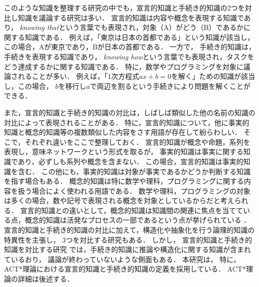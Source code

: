 このような知識を整理する研究の中でも，宣言的知識と手続き的知識の2つを対比し知識を議論する研究は多い\cite{anderson1982acquisition, mccormick1997conceptual, ten1999procedural}．
宣言的知識は内容や概念を表現する知識であり，
{\it knowing that}\cite{ryle1945knowing}という言葉でも表現され，対象（A）がどう（B）であるかに関する知識である．
例えば，「東京は日本の首都である」という知識が該当し，この場合，Aが東京であり，Bが日本の首都である．
一方で，
手続き的知識は，手続きを表現する知識であり，
{\it knowing how}\cite{ryle1945knowing}という言葉でも表現され，タスクをどう達成するかに関する知識である．
特に，数学やプログラミングを対象に議論されることが多い．
例えば，「1次方程式$ax + b = 0$を解く」ための知識が該当し，この場合，
$b$を移行し$a$で両辺を割るという手続きにより問題を解くことができる．

また，宣言的知識と手続き的知識の対比は，しばしば類似した他の名前の知識の対比によって表現されることがある．
特に，宣言的知識について，他に事実的知識と概念的知識等の複数類似した内容をさす用語が存在して紛らわしい．
そこで，それぞれ違いをここで整理しておく．
宣言的知識が概念や命題，系列を表現し，意味ネットワークという形式を取る\cite{anderson1990adaptive}が，
事実的知識は事実に関する知識であり，必ずしも系列や概念を含まない．
この場合，宣言的知識は事実的知識を含む．
この他にも，事実的知識は対象が事実であるかどうか判断する知識を指す場合もある\cite{unger1968analysis}．
概念的知識は特に数学や理科，プログラミングに関する内容を扱う場合によく使われる用語である\cite{mccormick1997conceptual, rittle1999conceptual, hiebert2013conceptual}．
数学や理科，プログラミングの対象は多くの場合，数や記号で表現される概念を対象としているからだと考えられる．
宣言的知識との違いとして，概念的知識は知識間の関連に焦点を当てている点，概念的知識は活発なプロセスの一部であるという点が挙げられている
\cite{mccormick1997conceptual}．
宣言的知識と手続き的知識の対比に加えて，構造化や抽象化を行う論理的知識の特異性を主張し，
3つを対比する研究もある\cite{cauley1986studying}．
しかし，
宣言的知識と手続き的知識を対比する研究
\cite{anderson1982acquisition, anderson1990adaptive}では，手続き的知識に推論や構造化に関する知識が含まれているおり，
議論が終わっていないような側面もある．
本研究は，
特に，ACT*理論\cite{anderson1982acquisition, anderson1990adaptive}における宣言的知識と手続き的知識の定義を採用している．
ACT*理論の詳細は後述する．


